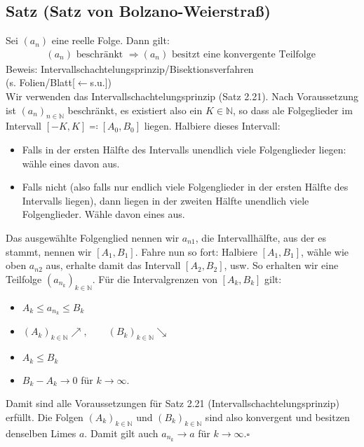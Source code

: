 \documentclass[12pt, titlepage]{article}
\newcommand{\N}{\mathds{N}}
\renewcommand{\*}{\cdot}
\begin{document}
	\subsection{Satz (Satz von Bolzano-Weierstraß)}
	Sei $(a_n)$ eine reelle Folge. Dann gilt:
	\begin{align*}
		(a_n)\textrm{  beschränkt  }\Rightarrow(a_n)\textrm{  besitzt eine konvergente Teilfolge  }
	\end{align*}
	Beweis: Intervallschachtelungsprinzip/Bisektionsverfahren\\
	(s. Folien/Blatt[$\leftarrow$s.u.])
	\\
	Wir verwenden das Intervallschachtelungsprinzip (Satz 2.21). Nach Voraussetzung ist $(a_n)_{n\in\N}$ beschränkt, es existiert also ein $K\in\N$, so dass ale Folgeglieder im Intervall $[-K,K]\eqqcolon[A_0,B_0]$ liegen. Halbiere dieses Intervall:
	\begin{itemize}
		\item Falls in der ersten Hälfte des Intervalls unendlich viele Folgenglieder liegen: wähle eines davon aus.
		\item Falls nicht (also falls nur endlich viele Folgenglieder in der ersten Hälfte des Intervalls liegen), dann liegen in der zweiten Hälfte unendlich viele Folgenglieder. Wähle davon eines aus.
	\end{itemize}
	Das ausgewählte Folgenglied nennen wir $a_{n1}$, die Intervallhälfte, aus der es stammt, nennen wir $[A_1,B_1]$. Fahre nun so fort: Halbiere $[A_1,B_1]$, wähle wie oben $a_{n2}$ aus, erhalte damit das Intervall $[A_2,B_2]$, usw. So erhalten wir eine Teilfolge $(a_{n_k})_{k\in\N}$. Für die Intervalgrenzen von $[A_k,B_k]$ gilt:
	\begin{itemize}
		\item $A_k\leq a_{n_k}\leq B_k$
		\item $(A_k)_{k\in\N}\nearrow,\qquad(B_k)_{k\in\N}\searrow$
		\item $A_k\leq B_k$
		\item $B_k-A_k\rightarrow 0$ für $k\rightarrow\infty$. 
	\end{itemize}
	Damit sind alle Voraussetzungen für Satz 2.21 (Intervallschachtelungsprinzip) erfüllt. Die Folgen $(A_k)_{k\in\N}$ und $(B_k)_{k\in\N}$ sind also konvergent und besitzen denselben Limes $a$. Damit gilt auch $a_{n_k}\rightarrow a$ für $k\rightarrow\infty$.\hfill$\square$
\end{document}

